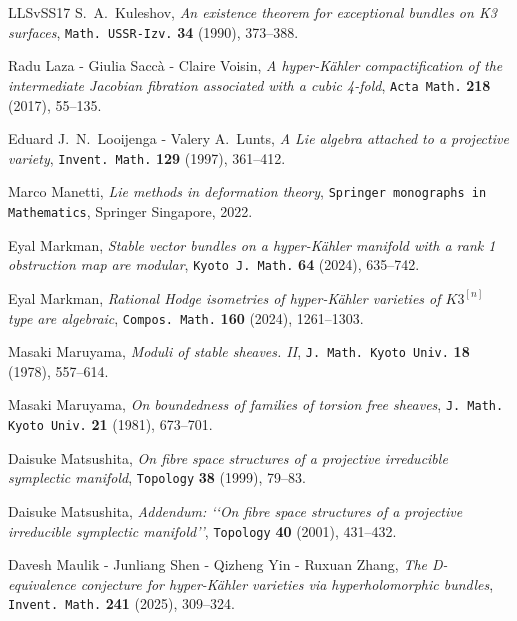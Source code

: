 \documentclass[11pt]{amsart}
\theoremstyle{definition}
\theoremstyle{remark}
\begin{document}
\begin{thebibliography}{LLSvSS17}
 S.~A.~Kuleshov, 
\emph{An existence theorem for exceptional bundles on K3 surfaces\/}, 
{\tt Math. USSR-Izv.} {\bf   34} (1990),  373--388.

 Radu Laza - Giulia Sacc\`a - Claire Voisin, 
\emph{A hyper-K\"ahler compactification of the intermediate Jacobian fibration associated with a cubic 4-fold\/}, 
{\tt Acta Math.} {\bf   218} (2017),  55--135.

 Eduard J.~N.~Looijenga - Valery A.~Lunts, 
\emph{A Lie algebra attached to a projective variety\/}, 
{\tt  Invent. Math.} {\bf   129} (1997), 361--412.


 Marco Manetti, \emph{Lie methods in deformation theory\/},  
{\tt Springer monographs in
  Mathematics}, Springer Singapore, 2022.

 Eyal Markman,
\emph{Stable vector bundles on a hyper-K\"ahler manifold with a rank 1 obstruction map are modular\/},  
{\tt Kyoto J. Math.} {\bf  64} (2024), 635--742.

 Eyal Markman,
\emph{Rational Hodge isometries of hyper-K\"ahler varieties of $K3^{[n]}$ type are algebraic\/},  
{\tt Compos.~Math.} {\bf   160} (2024),  1261--1303.


 Masaki Maruyama, 
\emph{Moduli of stable sheaves. II\/}, 
{\tt J. Math. Kyoto Univ.} {\bf  18} (1978),  557--614.


 Masaki Maruyama, 
\emph{On boundedness of families of torsion free sheaves\/}, 
{\tt J. Math. Kyoto Univ.} {\bf  21} (1981),  673--701.


 Daisuke Matsushita, 
\emph{On fibre space structures of a projective irreducible symplectic manifold\/}, 
{\tt Topology} {\bf  38} (1999),  79--83.

 Daisuke Matsushita, 
\emph{Addendum: \lq\lq On fibre space structures of a projective irreducible symplectic manifold\rq\rq\/},
{\tt Topology} {\bf 40} (2001),  431--432.


 Davesh Maulik - Junliang Shen - Qizheng Yin - Ruxuan Zhang, 
\emph{The D-equivalence conjecture for hyper-K\"ahler varieties via hyperholomorphic bundles\/},
{\tt Invent.~Math.} {\bf  241} (2025),  309--324.


\end{thebibliography}
\end{document}
